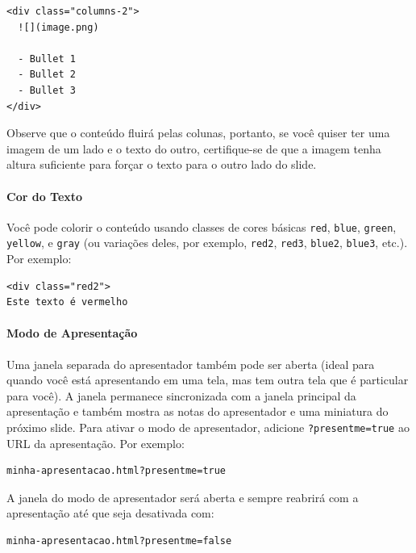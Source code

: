 \documentclass[
]{book}
\begin{document}
\begin{verbatim}
<div class="columns-2">
  ![](image.png)

  - Bullet 1
  - Bullet 2
  - Bullet 3
</div>
\end{verbatim}

Observe que o conteúdo fluirá pelas colunas, portanto, se você quiser ter uma imagem de um lado e o texto do outro, certifique-se de que a imagem tenha altura suficiente para forçar o texto para o outro lado do slide.

\hypertarget{cor-do-texto}{%
\paragraph{Cor do Texto}\label{cor-do-texto}}

Você pode colorir o conteúdo usando classes de cores básicas \texttt{red}, \texttt{blue}, \texttt{green}, \texttt{yellow}, e \texttt{gray} (ou variações deles, por exemplo, \texttt{red2}, \texttt{red3}, \texttt{blue2}, \texttt{blue3}, etc.). Por exemplo:

\begin{verbatim}
<div class="red2">
Este texto é vermelho
\end{verbatim}

\hypertarget{modo-de-apresentauxe7uxe3o}{%
\paragraph{Modo de Apresentação}\label{modo-de-apresentauxe7uxe3o}}

Uma janela separada do apresentador também pode ser aberta (ideal para quando você está apresentando em uma tela, mas tem outra tela que é particular para você). A janela permanece sincronizada com a janela principal da apresentação e também mostra as notas do apresentador e uma miniatura do próximo slide. Para ativar o modo de apresentador, adicione \texttt{?presentme=true} ao URL da apresentação. Por exemplo:

\begin{verbatim}
minha-apresentacao.html?presentme=true
\end{verbatim}

A janela do modo de apresentador será aberta e sempre reabrirá com a apresentação até que seja desativada com:

\begin{verbatim}
minha-apresentacao.html?presentme=false
\end{verbatim}
\end{document}
